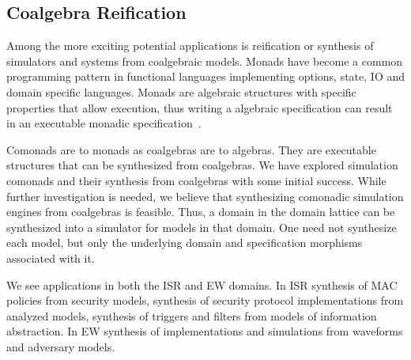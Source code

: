 \documentclass[12pt]{article}
\begin{document}
\subsection{Coalgebra Reification}

Among the more exciting potential applications is reification or
synthesis of simulators and systems from coalgebraic models.  Monads
have become a common programming pattern in functional languages
implementing options, state, IO and domain specific languages.  Monads
are algebraic structures with specific properties that allow
execution, thus writing a algebraic specification can result in an
executable monadic
specification~\cite{Kimmell:08:Synthesizing-So,Peck:11:Hardware/Softwa}.

Comonads are to monads as coalgebras are to algebras.  They are
executable structures that can be synthesized from coalgebras.  We
have explored simulation comonads and their synthesis from coalgebras
with some initial success.  While further investigation is needed, we
believe that synthesizing comonadic simulation engines from coalgebras
is feasible.  Thus, a domain in the domain lattice can be synthesized
into a simulator for models in that domain.  One need not synthesize
each model, but only the underlying domain and specification morphisms
associated with it.

We see applications in both the ISR and EW domains.  In ISR synthesis
of MAC policies from security models, synthesis of security protocol
implementations from analyzed models, synthesis of triggers and
filters from models of information abstraction.  In EW synthesis of
implementations and simulations from waveforms and adversary models.


\end{document}
